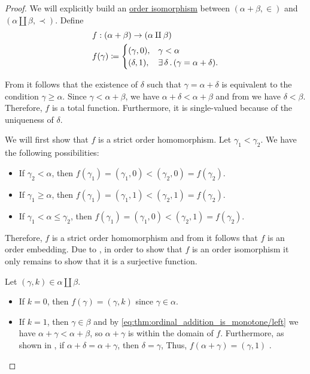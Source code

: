 \begin{proof}
  We will explicitly build an \hyperref[def:order_function/isomorphism]{order isomorphism} between \( (\alpha + \beta, \in) \) and \( (\alpha \amalg \beta, \prec) \). Define
  \begin{equation*}
    \begin{aligned}
      &f: (\alpha + \beta) \to (\alpha \amalg \beta) \\
      &f(\gamma) \coloneqq \begin{cases}
        (\gamma, 0), &\gamma < \alpha \\
        (\delta, 1), &\exists \thinspace \delta \thinspace . \thinspace (\gamma = \alpha + \delta).
      \end{cases}
    \end{aligned}
  \end{equation*}

  From  it follows that the existence of \( \delta \) such that \( \gamma = \alpha + \delta \) is equivalent to the condition \( \gamma \geq \alpha \). Since \( \gamma < \alpha + \beta \), we have \( \alpha + \delta < \alpha + \beta \) and from  we have \( \delta < \beta \). Therefore, \( f \) is a total function. Furthermore, it is single-valued because of the uniqueness of \( \delta \).

  We will first show that \( f \) is a strict order homomorphism. Let \( \gamma_1 < \gamma_2 \). We have the following possibilities:
  \begin{itemize}
    \item If \( \gamma_2 < \alpha \), then \( f(\gamma_1) = (\gamma_1, 0) < (\gamma_2, 0) = f(\gamma_2) \).
    \item If \( \gamma_1 \geq \alpha \), then \( f(\gamma_1) = (\gamma_1, 1) < (\gamma_2, 1) = f(\gamma_2) \).
    \item If \( \gamma_1 < \alpha \leq \gamma_2 \), then \( f(\gamma_1) = (\gamma_1, 0) < (\gamma_2, 1) = f(\gamma_2) \).
  \end{itemize}

  Therefore, \( f \) is a strict order homomorphism and from  it follows that \( f \) is an order embedding. Due to , in order to show that \( f \) is an order isomorphism it only remains to show that it is a surjective function.

  Let \( (\gamma, k) \in \alpha \amalg \beta \).
  \begin{itemize}
    \item If \( k = 0 \), then \( f(\gamma) = (\gamma, k) \) since \( \gamma \in \alpha \).
    \item If \( k = 1 \), then \( \gamma \in \beta \) and by \eqref{eq:thm:ordinal_addition_is_monotone/left} we have \( \alpha + \gamma < \alpha + \beta \), so \( \alpha + \gamma \) is within the domain of \( f \). Furthermore, as shown in , if \( \alpha + \delta = \alpha + \gamma \), then \( \delta = \gamma \), Thus, \( f(\alpha + \gamma) = (\gamma, 1) \) .
  \end{itemize}


\end{proof}
